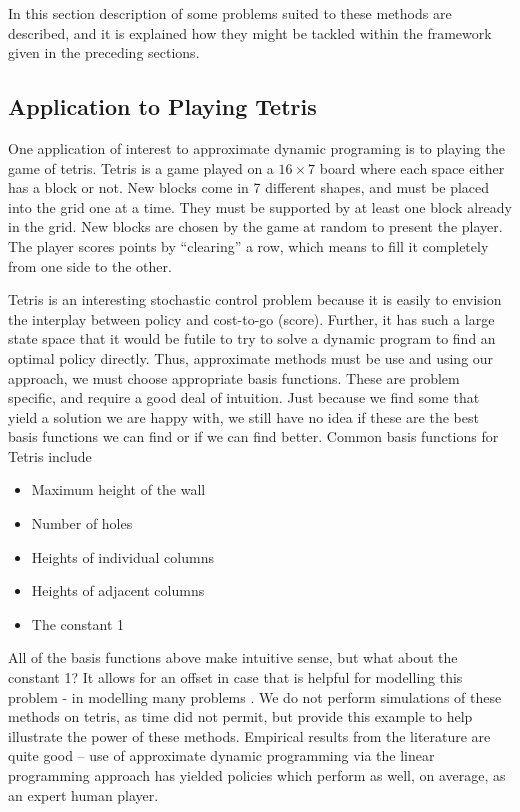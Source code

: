 \documentclass[12pt,reqno]{amsart}
\numberwithin{equation}{section}
\begin{document}
In this section description of some problems suited to these methods are described, and  it is explained how they might be tackled within the framework given in the preceding sections.

\subsection{Application to Playing Tetris}

One application of interest to approximate dynamic programing is to playing the game of tetris. Tetris is a game played on a $16 \times 7$ board where each space either has a block or not. New blocks come in 7 different shapes, and must be placed into the grid one at a time. They must be supported by at least one block already in the grid. New blocks are chosen by the game at random to present the player. The player scores points by ``clearing'' a row, which means to fill it completely from one side to the other.

Tetris is an interesting stochastic control problem because it is easily to envision the interplay between policy and cost-to-go (score). Further, it has such a large state space that it would be futile to try to solve a dynamic program to find an optimal policy directly. Thus, approximate methods must be use and using our approach, we must choose appropriate basis functions. These are problem specific, and require a good deal of intuition. Just because we find some that yield a solution we are happy with, we still have no idea if these are the best basis functions we can find or if we can find better. Common basis functions for Tetris include
\begin{itemize}
\item Maximum height of the wall
\item Number of holes
\item Heights of individual columns
\item Heights of adjacent columns
\item The constant 1
\end{itemize}

All of the basis functions above make intuitive sense, but what about the constant 1? It allows for an offset in case that is helpful for modelling this problem - in modelling many problems . We do not perform simulations of these methods on tetris, as time did not permit, but provide this example to help illustrate the power of these methods. Empirical results from the literature are quite good -- use of approximate dynamic programming via the linear programming approach has yielded policies which perform as well, on average, as an expert human player.
\end{document}
